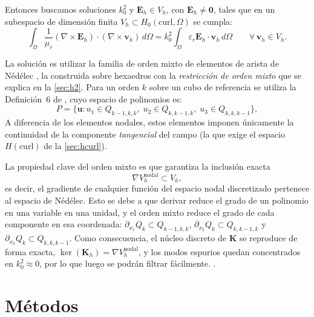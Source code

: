 \documentclass[12pt]{report} %
\begin{document}
Entonces buscamos soluciones $k_0^2$ y $\mathbf{E}_h\in V_h$, con $\mathbf{E}_h\neq\mathbf{0}$, tales que en un subespacio de dimensi\'on finita $V_h\subset H_0(\mathrm{curl},\Omega)$ se cumpla:
\begin{equation}\label{eq:forma-debil-fe}
	\int_\Omega \frac{1}{\mu_r} (\nabla\times\mathbf{E}_h)\cdot(\nabla\times\mathbf{v}_h)\,d\Omega
	= k_0^2 \int_\Omega \varepsilon_r \mathbf{E}_h\cdot\mathbf{v}_h\,d\Omega
	\qquad \forall\,\mathbf{v}_h\in V_h.
\end{equation}

La solución es utilizar la familia de orden mixto de elementos de arista de N\'ed\'elec \cite{nedelec1980}, la construida sobre hexaedros con la \emph{restricci\'on de orden mixto} que se explica en la \autoref{sec:h2}. Para un orden $k$ sobre un cubo de referencia se utiliza la Definici\'on~6 de \cite{nedelec1980}, cuyo espacio de polinomios es:
\begin{equation}\label{eq:familia-nedelec}
	P = \bigl\{ \mathbf{u} : u_1\in Q_{k-1,k,k},\; u_2\in Q_{k,k-1,k},\; u_3\in Q_{k,k,k-1} \bigr\},
\end{equation}
A diferencia de los elementos nodales, estos elementos imponen \'unicamente la continuidad de la componente \emph{tangencial} del campo (la que exige el espacio $H(\mathrm{curl})$ de la \autoref{sec:hcurl}). 

La propiedad clave del orden mixto es que garantiza la inclusi\'on exacta
\begin{equation}\label{eq:gradiente-incluido}
	\nabla V_h^{\text{nodal}} \subset V_h,
\end{equation}
es decir, el gradiente de cualquier funci\'on del espacio nodal discretizado pertenece al espacio de N\'ed\'elec. Esto se debe a que derivar reduce el grado de un polinomio en una variable en una unidad, y el orden mixto reduce el grado de cada componente en esa coordenada: $\partial_{x_1}Q_k\subset Q_{k-1,k,k}$, $\partial_{x_2}Q_k\subset Q_{k,k-1,k}$ y $\partial_{x_3}Q_k\subset Q_{k,k,k-1}$. Como consecuencia, el n\'ucleo discreto de $\mathbf{K}$ se reproduce de forma exacta, $\ker(\mathbf{K}_h)=\nabla V_h^{\text{nodal}}$, y los modos espurios quedan concentrados en $k_0^2\approx 0$, por lo que luego se podrán filtrar fácilmente. \cite{nedelec1980, davidson2003, jacobsson2007nedelec}.


\chapter{Métodos}\label{cap:metodos}
\end{document}
